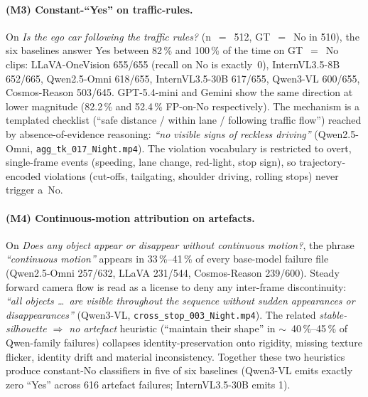 \documentclass[11pt,a4paper]{article}
\newcommand{\pct}[1]{#1\,\%}
\newcommand{\code}[1]{\texttt{#1}}
\begin{document}
\paragraph{(M3) Constant-``Yes'' on traffic-rules.} On \emph{Is the ego
car following the traffic rules?} (n~$=$~512, GT~$=$~No in 510), the
six baselines answer Yes between \pct{82} and \pct{100} of the time on
GT~$=$~No clips: LLaVA-OneVision 655/655 (recall on No is exactly~0),
InternVL3.5-8B 652/665, Qwen2.5-Omni 618/655, InternVL3.5-30B 617/655,
Qwen3-VL 600/655, Cosmos-Reason 503/645. GPT-5.4-mini and Gemini show
the same direction at lower magnitude (\pct{82.2} and \pct{52.4}
FP-on-No respectively). The mechanism is a templated checklist
(``safe distance / within lane / following traffic flow'') reached by
absence-of-evidence reasoning: \emph{``no visible signs of
reckless driving''} (Qwen2.5-Omni, \code{agg\_tk\_017\_Night.mp4}). The
violation vocabulary is restricted to overt, single-frame events
(speeding, lane change, red-light, stop sign), so trajectory-encoded
violations (cut-offs, tailgating, shoulder driving, rolling stops) never
trigger a~No.

\paragraph{(M4) Continuous-motion attribution on artefacts.} On
\emph{Does any object appear or disappear without continuous motion?},
the phrase \emph{``continuous motion''} appears in \pct{33}--\pct{41} of
every base-model failure file (Qwen2.5-Omni 257/632, LLaVA 231/544,
Cosmos-Reason 239/600). Steady forward camera flow is read as a license
to deny any inter-frame discontinuity: \emph{``all objects \dots\ are
visible throughout the sequence without sudden appearances or
disappearances''} (Qwen3-VL, \code{cross\_stop\_003\_Night.mp4}). The
related \emph{stable-silhouette $\Rightarrow$ no artefact} heuristic
(``maintain their shape'' in $\sim$~\pct{40}--\pct{45} of Qwen-family
failures) collapses identity-preservation onto rigidity, missing
texture flicker, identity drift and material inconsistency. Together
these two heuristics produce constant-No classifiers in five of six
baselines (Qwen3-VL emits exactly zero ``Yes'' across 616 artefact
failures; InternVL3.5-30B emits 1).
\end{document}
